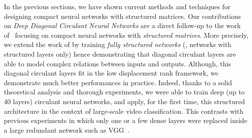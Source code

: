 In the previous sections, we have shown current methods and techniques for designing compact neural networks with structured matrices. 
Our contributions on \emph{Deep Diagonal Circulant Neural Networks} are a direct follow-up to the work of~\citet{cheng2015exploration,sindhwani2015structured,moczulski2016acdc,thomas2018learning} focusing on compact neural networks with \emph{structured matrices}.
More precisely, we extend the work of \citet{moczulski2016acdc} by training \emph{fully structured networks} (\ie, networks with structured layers only) hence demonstrating that diagonal circulant layers are able to model complex relations between inputs and outputs.
Although, this diagonal circulant layers fit in the low displacement rank framework, we demonstrate much better performances in practice.
Indeed, thanks to a solid theoretical analysis and thorough experiments, we were able to train deep (up to 40 layers) circulant neural networks, and apply, for the first time, this structured architecture in the context of large-scale video classification.
This contrasts with previous experiments in which only one or a few dense layers were replaced inside a large redundant network such as VGG~\cite{simonyan2014very}.





